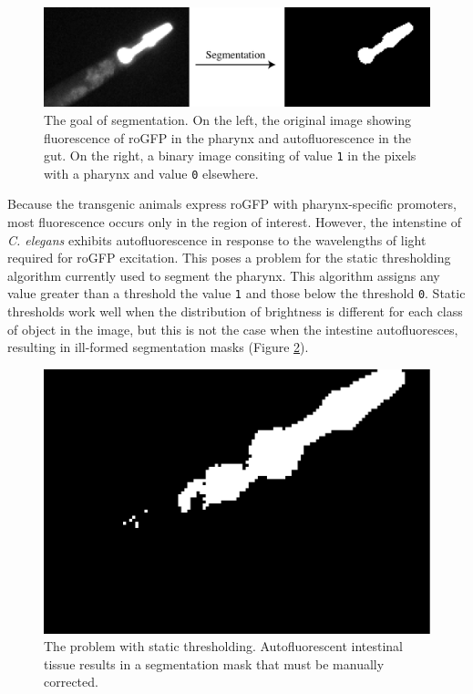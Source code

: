 \begin{figure}[ht]
    \centering
    \includegraphics[scale=.25]{Figures/rendered_files/segmentation_description}
    \decoRule
    \caption[The goal of segmentation]{The goal of segmentation. On the left, the original image showing fluorescence of roGFP in the pharynx and autofluorescence in the gut. On the right, a binary image consiting of value \texttt{1} in the pixels with a pharynx and value \texttt{0} elsewhere.}
    \label{fig:SegmentationExample}
\end{figure}

Because the transgenic animals express roGFP with pharynx-specific promoters, most fluorescence occurs only in the region of interest. However, the intenstine of \textit{C. elegans} exhibits autofluorescence in response to the wavelengths of light required for roGFP excitation. This poses a problem for the static thresholding algorithm currently used to segment the pharynx. This algorithm assigns any value greater than a threshold the value \texttt{1} and those below the threshold \texttt{0}. Static thresholds work well when the distribution of brightness is different for each class of object in the image, but this is not the case when the intestine autofluoresces, resulting in ill-formed segmentation masks (Figure \ref{fig:SegmentationNaive}).

\begin{figure}[ht]
    \centering
    \includegraphics[scale=.25]{Figures/rendered_files/segmentation_naive}
    \decoRule
    \caption[The problem with static thresholding]{The problem with static thresholding. Autofluorescent intestinal tissue results in a segmentation mask that must be manually corrected.}
    \label{fig:SegmentationNaive}
\end{figure}

